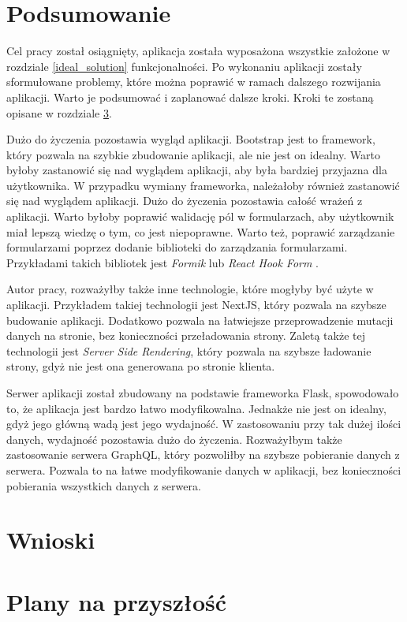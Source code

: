 \section{Podsumowanie}
Cel pracy został osiągnięty, aplikacja została wyposażona wszystkie założone w rozdziale \ref{ideal_solution} funkcjonalności. Po wykonaniu aplikacji zostały sformułowane problemy, które można poprawić w ramach dalszego rozwijania aplikacji. Warto je podsumować i zaplanować dalsze kroki. Kroki te zostaną opisane w rozdziale \ref{future_plans}. 

Dużo do życzenia pozostawia wygląd aplikacji. Bootstrap jest to framework, który pozwala na szybkie zbudowanie aplikacji, ale nie jest on idealny. Warto byłoby zastanowić się nad wyglądem aplikacji, aby była bardziej przyjazna dla użytkownika. W przypadku wymiany frameworka, należałoby również zastanowić się nad wyglądem aplikacji. Dużo do życzenia pozostawia całość wrażeń z aplikacji. Warto byłoby poprawić walidację pól w formularzach, aby użytkownik miał lepszą wiedzę o tym, co jest niepoprawne. Warto też, poprawić zarządzanie formularzami poprzez dodanie biblioteki do zarządzania formularzami. Przykładami takich bibliotek jest \textit{Formik} \cite{Formik} lub \textit{React Hook Form} \cite{React_hook_form}.

Autor pracy, rozważyłby także inne technologie, które mogłyby być użyte w aplikacji. Przykładem takiej technologii jest NextJS, który pozwala na szybsze budowanie aplikacji. Dodatkowo pozwala na łatwiejsze przeprowadzenie mutacji danych na stronie, bez konieczności przeładowania strony. Zaletą także tej technologii jest \textit{Server Side Rendering}, który pozwala na szybsze ładowanie strony, gdyż nie jest ona generowana po stronie klienta.

Serwer aplikacji został zbudowany na podstawie frameworka Flask, spowodowało to, że aplikacja jest bardzo łatwo modyfikowalna. Jednakże nie jest on idealny, gdyż jego główną wadą jest jego wydajność. W zastosowaniu przy tak dużej ilości danych, wydajność pozostawia dużo do życzenia. Rozważyłbym także zastosowanie serwera GraphQL, który pozwoliłby na szybsze pobieranie danych z serwera. Pozwala to na łatwe modyfikowanie danych w aplikacji, bez konieczności pobierania wszystkich danych z serwera.

\section{Wnioski}


\section{Plany na przyszłość}\label{future_plans}
